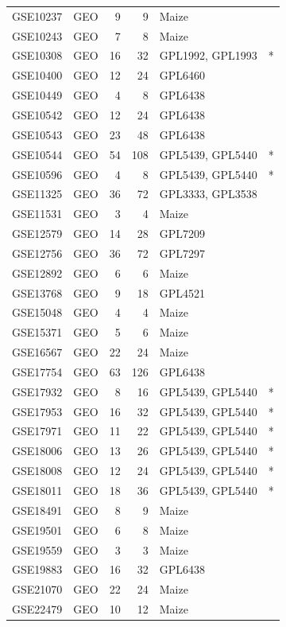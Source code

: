 \begin{ThreePartTable}
\begin{footnotesize}
\begin{longtable}{@{}|>{\centering\arraybackslash}p{2.5cm} | 
>{\centering\arraybackslash}p{1.5cm} rr 
>{\scriptsize\raggedright}p{2.5cm} c |@{}}
GSE10237 & GEO & 9 & 9 & Maize\tnote{2} & \\
GSE10243 & GEO & 7 & 8 & Maize\tnote{2} & \\
GSE10308 & GEO & 16 & 32 & GPL1992, GPL1993 & * \\
GSE10400 & GEO & 12 & 24 & GPL6460 & \\
GSE10449 & GEO & 4 & 8 & GPL6438 & \\
GSE10542 & GEO & 12 & 24 & GPL6438 & \\
GSE10543 & GEO & 23 & 48 & GPL6438 & \\
GSE10544 & GEO & 54 & 108 & GPL5439, GPL5440 & * \\
GSE10596 & GEO & 4 & 8 & GPL5439, GPL5440 & * \\
GSE11325 & GEO & 36 & 72 & GPL3333, GPL3538 & \\
GSE11531 & GEO & 3 & 4 & Maize\tnote{2} & \\
GSE12579 & GEO & 14 & 28 & GPL7209 & \\
GSE12756 & GEO & 36 & 72 & GPL7297 & \\
GSE12892 & GEO & 6 & 6 & Maize\tnote{2} & \\
GSE13768 & GEO & 9 & 18 & GPL4521 & \\
GSE15048 & GEO & 4 & 4 & Maize\tnote{2} & \\
GSE15371 & GEO & 5 & 6 & Maize\tnote{2} & \\
GSE16567 & GEO & 22 & 24 & Maize\tnote{2} & \\
GSE17754 & GEO & 63 & 126 & GPL6438 & \\
GSE17932 & GEO & 8 & 16 & GPL5439, GPL5440 & * \\
GSE17953 & GEO & 16 & 32 & GPL5439, GPL5440 & * \\
GSE17971 & GEO & 11 & 22 & GPL5439, GPL5440 & * \\
GSE18006 & GEO & 13 & 26 & GPL5439, GPL5440 & * \\
GSE18008 & GEO & 12 & 24 & GPL5439, GPL5440 & * \\
GSE18011 & GEO & 18 & 36 & GPL5439, GPL5440 & * \\
GSE18491 & GEO & 8 & 9 & Maize\tnote{2} & \\
GSE19501 & GEO & 6 & 8 & Maize\tnote{2} & \\
GSE19559 & GEO & 3 & 3 & Maize\tnote{2} & \\
GSE19883 & GEO & 16 & 32 & GPL6438 & \\
GSE21070 & GEO & 22 & 24 & Maize\tnote{2} & \\
GSE22479 & GEO & 10 & 12 & Maize\tnote{2} & \\

\end{longtable}
\end{footnotesize}
\end{ThreePartTable}
